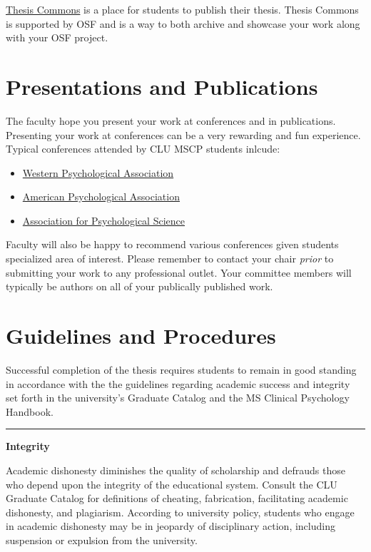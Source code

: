 \documentclass[openany]{book}
\providecommand{\tightlist}{%
  \setlength{\itemsep}{0pt}\setlength{\parskip}{0pt}}
\begin{document}
\href{https://thesiscommons.org/}{Thesis Commons} is a place for students to publish their thesis. Thesis Commons is supported by OSF and is a way to both archive and showcase your work along with your OSF project.

\hypertarget{presentations-and-publications}{%
\chapter{Presentations and Publications}\label{presentations-and-publications}}

The faculty hope you present your work at conferences and in publications. Presenting your work at conferences can be a very rewarding and fun experience. Typical conferences attended by CLU MSCP students inlcude:

\begin{itemize}
\tightlist
\item
  \href{https://westernpsych.org/convention/}{Western Psychological Association}
\item
  \href{https://convention.apa.org/}{American Psychological Association}
\item
  \href{https://www.psychologicalscience.org/conventions/annual}{Association for Psychological Science}
\end{itemize}

Faculty will also be happy to recommend various conferences given students specialized area of interest. Please remember to contact your chair \emph{prior} to submitting your work to any professional outlet. Your committee members will typically be authors on all of your publically published work.

\hypertarget{guidelines-and-procedures}{%
\chapter{Guidelines and Procedures}\label{guidelines-and-procedures}}

Successful completion of the thesis requires students to remain in good standing in accordance with the the guidelines regarding academic success and integrity set forth in the university's Graduate Catalog and the MS Clinical Psychology Handbook.

\begin{center}\rule{0.5\linewidth}{0.5pt}\end{center}

\textbf{Integrity}

Academic dishonesty diminishes the quality of scholarship and defrauds those who depend upon the integrity of the educational system. Consult the CLU Graduate Catalog for definitions of cheating, fabrication, facilitating academic dishonesty, and plagiarism. According to university policy, students who engage in academic dishonesty may be in jeopardy of disciplinary action, including suspension or expulsion from the university.
\end{document}
